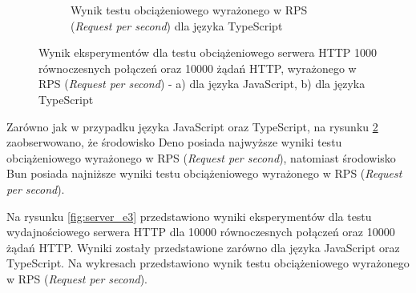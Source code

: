 \begin{figure}[H]
\begin{subfigure}[b]{0.44\textwidth}
    \caption{Wynik testu obciążeniowego wyrażonego w RPS (\textit{Request per second}) dla języka TypeScript}
    \label{fig:server_e2_ts}
  \end{subfigure}
  \hfill
  \caption{Wynik eksperymentów dla testu obciążeniowego serwera HTTP 1000 równoczesnych połączeń oraz 10000 żądań HTTP, wyrażonego w RPS (\textit{Request per second}) - a) dla języka JavaScript, b) dla języka TypeScript}
  \label{fig:server_e2}
\end{figure}

Zarówno jak w przypadku języka JavaScript oraz TypeScript, na rysunku \ref{fig:server_e2} zaobserwowano, że środowisko Deno posiada najwyższe wyniki testu obciążeniowego wyrażonego w RPS (\textit{Request per second}), natomiast środowisko Bun posiada najniższe wyniki testu obciążeniowego wyrażonego w RPS (\textit{Request per second}).

Na rysunku \ref{fig:server_e3} przedstawiono wyniki eksperymentów dla testu wydajnościowego serwera HTTP dla 10000 równoczesnych połączeń oraz 10000 żądań HTTP. Wyniki zostały przedstawione zarówno dla języka JavaScript oraz TypeScript. Na wykresach przedstawiono wynik testu obciążeniowego wyrażonego w RPS (\textit{Request per second}).

